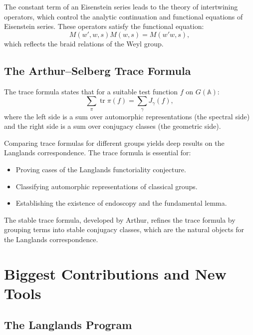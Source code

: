 The constant term of an Eisenstein series leads to the theory of intertwining operators, which control the analytic continuation and functional equations of Eisenstein series. These operators satisfy the functional equation:
\[
M(w', w, s) M(w, s) = M(w'w, s),
\]
which reflects the braid relations of the Weyl group.

\subsection{The Arthur--Selberg Trace Formula}

The trace formula states that for a suitable test function $f$ on $G(\mathbb{A})$:
\[
\sum_{\pi} \operatorname{tr} \pi(f) = \sum_{\gamma} J_\gamma(f),
\]
where the left side is a sum over automorphic representations (the spectral side) and the right side is a sum over conjugacy classes (the geometric side).

Comparing trace formulas for different groups yields deep results on the Langlands correspondence. The trace formula is essential for:
\begin{itemize}
\item Proving cases of the Langlands functoriality conjecture.
\item Classifying automorphic representations of classical groups.
\item Establishing the existence of endoscopy and the fundamental lemma.
\end{itemize}

The stable trace formula, developed by Arthur, refines the trace formula by grouping terms into stable conjugacy classes, which are the natural objects for the Langlands correspondence.

\section{Biggest Contributions and New Tools}

\subsection{The Langlands Program}

